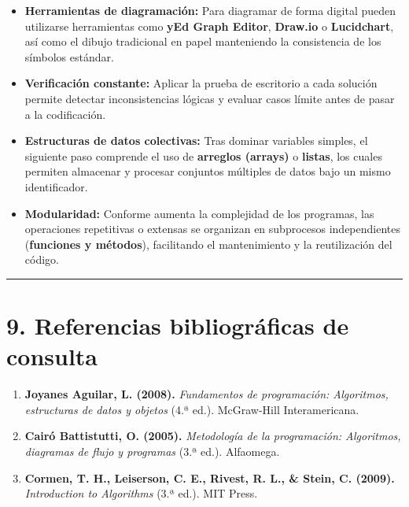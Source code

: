 \begin{itemize}
\tightlist
\item
  \textbf{Herramientas de diagramación:} Para diagramar de forma digital
  pueden utilizarse herramientas como \textbf{yEd Graph Editor},
  \textbf{Draw.io} o \textbf{Lucidchart}, así como el dibujo tradicional
  en papel manteniendo la consistencia de los símbolos estándar.
\item
  \textbf{Verificación constante:} Aplicar la prueba de escritorio a
  cada solución permite detectar inconsistencias lógicas y evaluar casos
  límite antes de pasar a la codificación.
\item
  \textbf{Estructuras de datos colectivas:} Tras dominar variables
  simples, el siguiente paso comprende el uso de \textbf{arreglos
  (arrays)} o \textbf{listas}, los cuales permiten almacenar y procesar
  conjuntos múltiples de datos bajo un mismo identificador.
\item
  \textbf{Modularidad:} Conforme aumenta la complejidad de los
  programas, las operaciones repetitivas o extensas se organizan en
  subprocesos independientes (\textbf{funciones y métodos}), facilitando
  el mantenimiento y la reutilización del código.
\end{itemize}

\begin{center}\rule{0.5\linewidth}{0.5pt}\end{center}

\section{9. Referencias bibliográficas de
consulta}\label{referencias-bibliogruxe1ficas-de-consulta}

\begin{enumerate}
\def\labelenumi{\arabic{enumi}.}
\tightlist
\item
  \textbf{Joyanes Aguilar, L. (2008).} \emph{Fundamentos de
  programación: Algoritmos, estructuras de datos y objetos} (4.ª ed.).
  McGraw-Hill Interamericana.
\item
  \textbf{Cairó Battistutti, O. (2005).} \emph{Metodología de la
  programación: Algoritmos, diagramas de flujo y programas} (3.ª ed.).
  Alfaomega.
\item
  \textbf{Cormen, T. H., Leiserson, C. E., Rivest, R. L., \& Stein, C.
  (2009).} \emph{Introduction to Algorithms} (3.ª ed.). MIT Press.
\end{enumerate}
